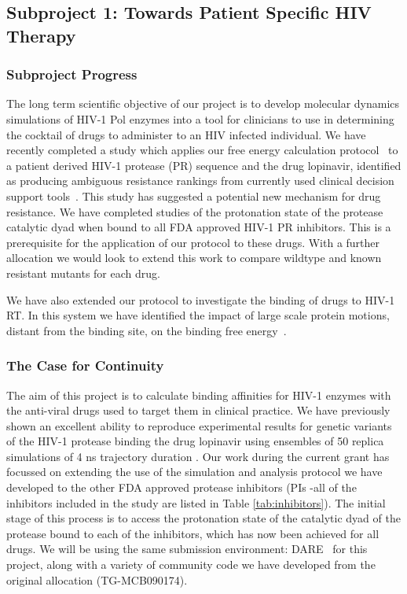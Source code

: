 \documentclass[a4paper,11pt]{article}
\begin{document}
\subsection{Subproject 1: Towards Patient Specific HIV Therapy}

\subsubsection{Subproject Progress}
The long term scientific objective of our project is to develop molecular dynamics simulations of HIV-1 Pol enzymes into a tool for clinicians to use in determining the cocktail of drugs to administer to an HIV infected individual. We have recently completed a study which applies our free energy calculation protocol~\cite{Ref2} to a patient derived HIV-1 protease (PR) sequence and the drug lopinavir, identified as producing ambiguous resistance rankings from currently used clinical decision support tools~\cite{Ref3}. This study has suggested a potential new mechanism for drug resistance. We have completed studies of the protonation state of the protease catalytic dyad when bound to all FDA approved HIV-1 PR inhibitors. This is a prerequisite for the application of our protocol to these drugs. With a further allocation we would look to extend this work to compare wildtype and known resistant mutants for each drug.

We have also extended our protocol to investigate the binding of drugs to HIV-1 RT. In this system we have identified the impact of large scale protein motions, distant from the binding site, on the binding free energy~\cite{Ref4}.


\subsubsection{The Case for Continuity}

The aim of this project is to calculate binding affinities for HIV-1 enzymes with the anti-viral 
drugs used to target them in clinical practice. We have previously shown an excellent ability to
reproduce experimental results for genetic variants of the HIV-1 protease binding the drug 
lopinavir using ensembles of 50 replica simulations of 4 ns trajectory duration \cite{Sadiq2010}. 
Our work during the current grant has focussed on extending the use of the simulation and analysis 
protocol we have developed to the other FDA approved protease inhibitors (PIs -all of the inhibitors 
included in the study are listed in Table \ref{tab:inhibitors}). 
The initial stage of this process is to access the protonation state of the catalytic dyad of the 
protease bound to each of the inhibitors, which has now been achieved for all drugs. We will be
using the same submission environment: DARE~\cite{dare-tg11} for this project, along with a variety
of community code we have developed from the original allocation (TG-MCB090174).
\end{document}
